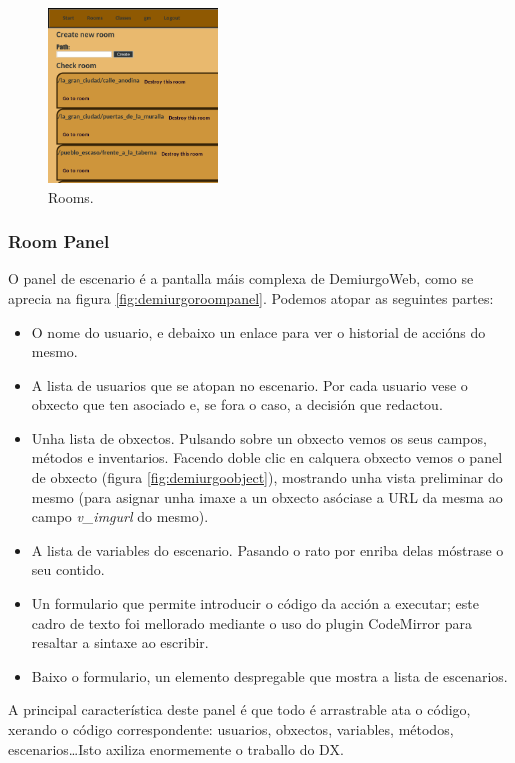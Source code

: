 \begin{figure}
\centerline{\includegraphics[width=0.4\textwidth]{figuras/demiurgo_rooms.png}}
\caption{Rooms.}
\label{fig:demiurgorooms}
\end{figure}

\subsubsection{Room Panel}
O panel de escenario é a pantalla máis complexa de DemiurgoWeb, como se aprecia
na figura \ref{fig:demiurgoroompanel}. Podemos atopar as seguintes partes:
\begin{itemize}
  \item O nome do usuario, e debaixo un enlace para ver o historial de accións
  do mesmo.
  \item A lista de usuarios que se atopan no escenario. Por cada usuario vese o
  obxecto que ten asociado e, se fora o caso, a decisión que redactou.
  \item Unha lista de obxectos. Pulsando sobre un obxecto vemos os seus campos,
  métodos e inventarios. Facendo doble clic en calquera obxecto vemos o panel de
  obxecto (figura \ref{fig:demiurgoobject}), mostrando unha vista preliminar do
  mesmo (para asignar unha imaxe a un obxecto asóciase a URL da mesma ao
  campo \textit{v\_imgurl} do mesmo).
  \item A lista de variables do escenario. Pasando o rato por enriba delas
  móstrase o seu contido.
  \item Un formulario que permite introducir o código da acción a executar; este
  cadro de texto foi mellorado mediante o uso do plugin CodeMirror para resaltar
  a sintaxe ao escribir.
  \item Baixo o formulario, un elemento despregable que mostra a lista de
  escenarios.
\end{itemize}
A principal característica deste panel é que todo é arrastrable ata o código,
xerando o código correspondente: usuarios, obxectos, variables, métodos,
escenarios\ldots Isto axiliza enormemente o traballo do DX.


